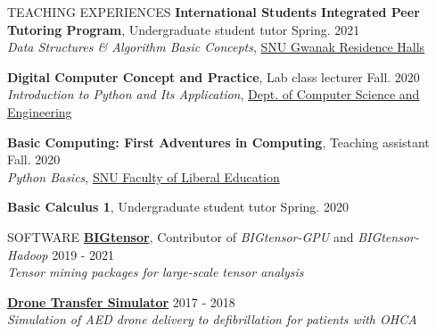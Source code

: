\documentclass[10pt]{resume} %
\begin{document}
\begin{rSection}{TEACHING EXPERIENCES} 
{\bf International Students Integrated Peer Tutoring Program}, Undergraduate student tutor \hfill Spring. 2021 \\
\textit{Data Structures \& Algorithm Basic Concepts}, \href{https://dorm.snu.ac.kr/}{SNU Gwanak Residence Halls}

{\bf Digital Computer Concept and Practice}, Lab class lecturer \hfill Fall. 2020 \\
\textit{Introduction to Python and Its Application}, \href{https://cse.snu.ac.kr/}{Dept. of Computer Science and Engineering}

{\bf Basic Computing: First Adventures in Computing}, Teaching assistant \hfill Fall. 2020 \\
\textit{Python Basics}, \href{https://liberaledu.snu.ac.kr/}{SNU Faculty of Liberal Education}

{\bf Basic Calculus 1}, Undergraduate student tutor \hfill Spring. 2020
\end{rSection}

\begin{rSection}{SOFTWARE}
\href{https://datalab.snu.ac.kr/bigtensor/}{\bf BIGtensor},
Contributor of \textit{BIGtensor-GPU} and \textit{BIGtensor-Hadoop} \hfill 2019 - 2021 \\ 
\textit{Tensor mining packages for large-scale tensor analysis }

\href{https://github.com/rubis-lab/DroneTransferSimulator/}{\bf Drone Transfer Simulator}  \hfill 2017 - 2018 \\
\textit{Simulation of AED drone delivery to defibrillation for patients with OHCA}
\end{rSection}

\end{document}

